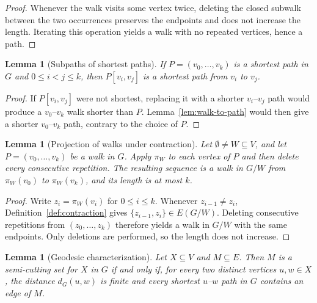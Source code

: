 \documentclass[11pt,a4paper]{amsart}
\theoremstyle{definition}
\theoremstyle{plain}
\newtheorem{lemma}[definition]{Lemma}
\newcommand{\dist}[3]{d_{#1}(#2,#3)}
\begin{document}
\begin{proof}
Whenever the walk visits some vertex twice, deleting the closed subwalk between the two occurrences preserves the endpoints and does not increase the length. Iterating this operation yields a walk with no repeated vertices, hence a path.
\end{proof}

\begin{lemma}[Subpaths of shortest paths]\label{lem:subpath-shortest}
If $P=(v_0,\dots,v_k)$ is a shortest path in $G$ and $0\le i<j\le k$, then $P[v_i,v_j]$ is a shortest path from $v_i$ to $v_j$.
\end{lemma}

\begin{proof}
If $P[v_i,v_j]$ were not shortest, replacing it with a shorter $v_i$--$v_j$ path would produce a $v_0$--$v_k$ walk shorter than $P$. Lemma~\ref{lem:walk-to-path} would then give a shorter $v_0$--$v_k$ path, contrary to the choice of $P$.
\end{proof}

\begin{lemma}[Projection of walks under contraction]\label{lem:projected-walk}
Let $\emptyset\neq W\subseteq V$, and let $P=(v_0,\dots,v_k)$ be a walk in $G$. Apply $\pi_W$ to each vertex of $P$ and then delete every consecutive repetition. The resulting sequence is a walk in $G/W$ from $\pi_W(v_0)$ to $\pi_W(v_k)$, and its length is at most $k$.
\end{lemma}

\begin{proof}
Write $z_i=\pi_W(v_i)$ for $0\le i\le k$. Whenever $z_{i-1}\neq z_i$, Definition~\ref{def:contraction} gives $\{z_{i-1},z_i\}\in E(G/W)$. Deleting consecutive repetitions from $(z_0,\dots,z_k)$ therefore yields a walk in $G/W$ with the same endpoints. Only deletions are performed, so the length does not increase.
\end{proof}

\begin{lemma}[Geodesic characterization]\label{lem:geodesic-characterization}
Let $X\subseteq V$ and $M\subseteq E$. Then $M$ is a semi-cutting set for $X$ in $G$ if and only if, for every two distinct vertices $u,w\in X$, the distance $\dist{G}{u}{w}$ is finite and every shortest $u$--$w$ path in $G$ contains an edge of $M$.
\end{lemma}
\end{document}
